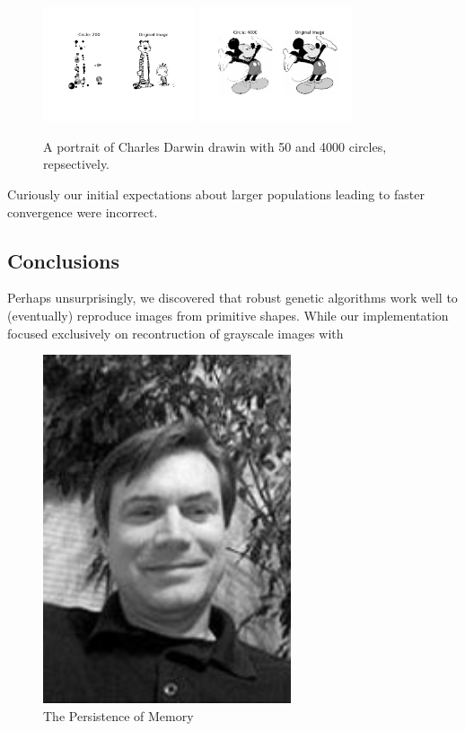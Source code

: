 \documentclass[12pt]{article}
\begin{document}
\begin{figure}[H]
\centering
\noindent\includegraphics[width=0.4\textwidth]{../results/cartoons/hobbes_0200}
\noindent\includegraphics[width=0.4\textwidth]{../results/mickey/mickey_4000}
\caption{A portrait of Charles Darwin drawin with 50 and 4000 circles, repsectively. }
\label{fig:hobbes_0200}
\end{figure}
Curiously our initial expectations about larger populations leading to faster convergence were incorrect. 


\subsection{Conclusions}
Perhaps unsurprisingly, we discovered that robust genetic algorithms work well to (eventually) reproduce images from primitive shapes. While our implementation focused exclusively on recontruction of grayscale images with 

\begin{figure}[H]
\centering
\noindent\includegraphics[width=0.65\textwidth]{../images/jmcgough}
\caption{The Persistence of Memory}
\label{fig:jmcgough}
\end{figure}
\end{document}
